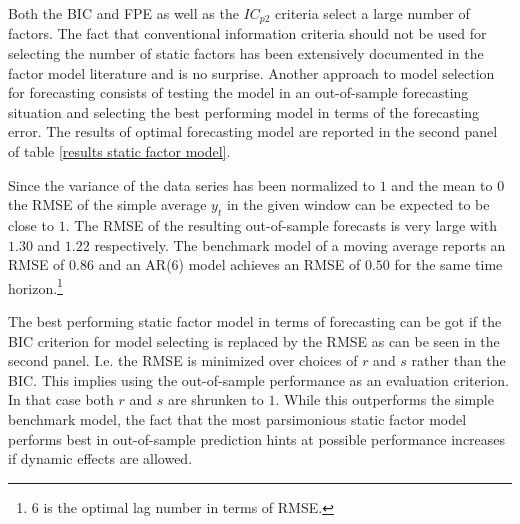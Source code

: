 \documentclass[12pt]{article}
\begin{document}
Both the BIC and FPE as well as the $IC_{p2}$ criteria select a large number of factors. The fact that conventional information criteria should not be used for selecting the number of static factors has been extensively documented in the factor model literature and is no surprise. Another approach to model selection for forecasting consists of testing the model in an out-of-sample forecasting situation and selecting the best performing model in terms of the forecasting error. The results of optimal forecasting model are reported in the second panel of table \ref{results static factor model}.

Since the variance of the data series has been normalized to $1$ and the mean to $0$ the RMSE of the simple average $y_t$ in the given window can be expected to be close to $1$. The RMSE of the resulting out-of-sample forecasts is very large with $1.30$ and $1.22$ respectively. The benchmark model of a moving average reports an RMSE of $0.86$ and an AR(6) model achieves an RMSE of $0.50$ for the same time horizon.\footnote{$6$ is the optimal lag number in terms of RMSE.}

The best performing static factor model in terms of forecasting can be got if the BIC criterion for model selecting is replaced by the RMSE as can be seen in the second panel. I.e. the RMSE is minimized over choices of $r$ and $s$ rather than the BIC. This implies using the out-of-sample performance as an evaluation criterion. In that case both $r$ and $s$ are shrunken to $1$. While this outperforms the simple benchmark model, the fact that the most parsimonious static factor model performs best in out-of-sample prediction hints at possible performance increases if dynamic effects are allowed.
\end{document}
